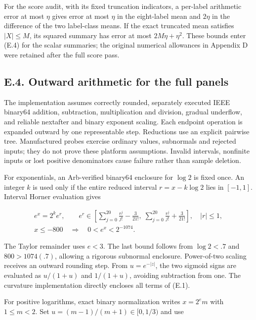 \documentclass{article}
\begin{document}
For the score audit, with its fixed truncation indicators, a per-label
arithmetic error at most \(\eta\) gives error at most \(\eta\) in the
eight-label mean and \(2\eta\) in the difference of the two label-class
means. If the exact truncated mean satisfies \(|X|\le M\), its squared
summary has error at most \(2M\eta+\eta^2\). These bounds enter (E.4)
for the scalar summaries; the original numerical allowances in Appendix
D were retained after the full score pass.

\subsection*{E.4. Outward arithmetic for the full
panels}\label{e.4.-outward-arithmetic-for-the-full-panels}

The implementation assumes correctly rounded, separately executed IEEE
binary64 addition, subtraction, multiplication and division, gradual
underflow, and reliable nextafter and binary exponent scaling. Each
endpoint operation is expanded outward by one representable step.
Reductions use an explicit pairwise tree. Manufactured probes exercise
ordinary values, subnormals and rejected inputs; they do not prove these
platform assumptions. Invalid intervals, nonfinite inputs or lost
positive denominators cause failure rather than sample deletion.

For exponentials, an Arb-verified binary64 enclosure for \(\log2\) is
fixed once. An integer \(k\) is used only if the entire reduced interval
\(r=x-k\log2\) lies in \([-1,1]\). Interval Horner evaluation gives

\[
\begin{gathered}
e^x=2^ke^r,\qquad
e^r\in\left[\sum_{j=0}^{20}\frac{r^j}{j!}-\frac3{21!},\;
\sum_{j=0}^{20}\frac{r^j}{j!}+\frac3{21!}\right],\quad |r|\le1,\\
x\le-800\quad\Longrightarrow\quad 0<e^x<2^{-1074}.
\end{gathered}
\tag{E.6}
\]

The Taylor remainder uses \(e<3\). The last bound follows from
\(\log2<.7\) and \(800>1074(.7)\), allowing a rigorous subnormal
enclosure. Power-of-two scaling receives an outward rounding step. From
\(u=e^{-|z|}\), the two sigmoid signs are evaluated as \(u/(1+u)\) and
\(1/(1+u)\), avoiding subtraction from one. The curvature implementation
directly encloses all terms of (E.1).

For positive logarithms, exact binary normalization writes \(x=2^em\)
with \(1\le m<2\). Set \(u=(m-1)/(m+1)\in[0,1/3)\) and use
\end{document}
